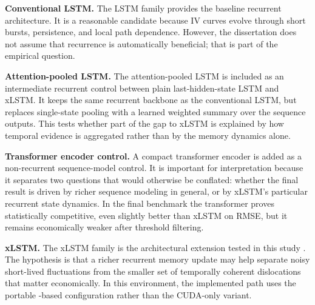 \documentclass[12pt]{report}
\newcommand{\code}[1]{\begingroup\ttfamily\path{#1}\endgroup}
\begin{document}
\textbf{Conventional LSTM.} The LSTM family provides the baseline recurrent architecture. It is a reasonable candidate because IV curves evolve through short bursts, persistence, and local path dependence. However, the dissertation does not assume that recurrence is automatically beneficial; that is part of the empirical question.

\textbf{Attention-pooled LSTM.} The attention-pooled LSTM is included as an intermediate recurrent control between plain last-hidden-state LSTM and xLSTM. It keeps the same recurrent backbone as the conventional LSTM, but replaces single-state pooling with a learned weighted summary over the sequence outputs. This tests whether part of the gap to xLSTM is explained by how temporal evidence is aggregated rather than by the memory dynamics alone.

\textbf{Transformer encoder control.} A compact transformer encoder \citep{vaswani2017} is added as a non-recurrent sequence-model control. It is important for interpretation because it separates two questions that would otherwise be conflated: whether the final result is driven by richer sequence modeling in general, or by xLSTM's particular recurrent state dynamics. In the final benchmark the transformer proves statistically competitive, even slightly better than xLSTM on RMSE, but it remains economically weaker after threshold filtering.

\textbf{xLSTM.} The xLSTM family is the architectural extension tested in this study \citep{beck2024xlstm}. The hypothesis is that a richer recurrent memory update may help separate noisy short-lived fluctuations from the smaller set of temporally coherent dislocations that matter economically. In this environment, the implemented path uses the portable \code{mLSTM}-based configuration rather than the CUDA-only \code{sLSTM} variant.
\end{document}
